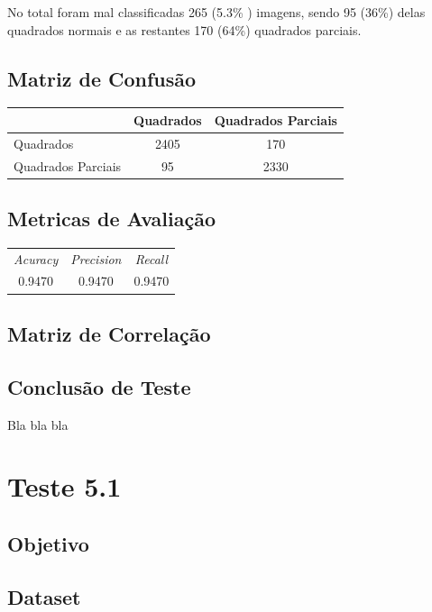 No total foram mal classificadas 265 (5.3\% ) imagens, sendo 95 (36\%) delas quadrados normais e as restantes 170 (64\%) quadrados parciais. 

\subsection{Matriz de Confusão}

\begin{table}[H]
\centering
\begin{tabular}{l|c c}
                   & Quadrados & Quadrados Parciais \\
\hline
Quadrados          & 2405         & 170                  \\
Quadrados Parciais & 95           & 2330                  \\
\end{tabular}
\end{table}

\subsection{Metricas de Avaliação}

\begin{table}[H]
\centering
\begin{tabular}{|c|c|c|}
\textit{Acuracy} & \textit{Precision} & \textit{Recall} \\
0.9470 & 0.9470 & 0.9470  \\
\end{tabular}
\end{table}

\subsection{Matriz de Correlação}

\subsection{Conclusão de Teste}
    Bla bla bla


\section{Teste 5.1}
\subsection{Objetivo}
\subsection{Dataset}
